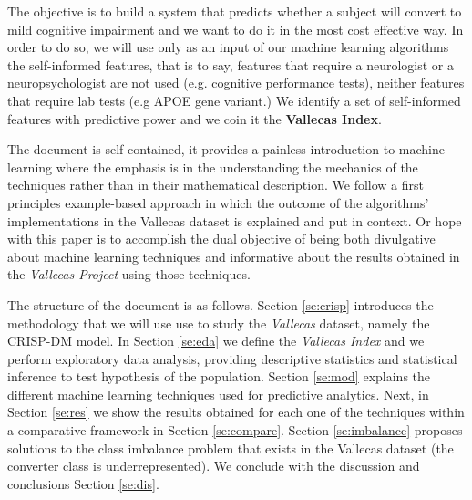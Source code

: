 \documentclass[11pt]{article}
\theoremstyle{definition}
\theoremstyle{remark}
\begin{document}
The objective is to build a system that predicts whether a subject will convert to mild cognitive impairment and we want to do it in the most cost effective way. In order to do so, we will use only as an input of our machine learning algorithms the self-informed features, that is to say, features that require a neurologist or a neuropsychologist are not used (e.g. cognitive performance tests), neither features that require lab tests (e.g APOE gene variant.)
We identify a set of self-informed features with predictive power and we coin it the \textbf{Vallecas Index}. 

The document is self contained, it provides a painless introduction to machine learning where the emphasis is in the understanding the mechanics of the techniques rather than in their mathematical description. We follow a first principles example-based approach in which the outcome of the algorithms' implementations in the Vallecas dataset is explained and put in context. Or hope with this paper is to accomplish the dual objective of being both divulgative about machine learning techniques and informative about the results obtained in the \emph{Vallecas Project} using those techniques.

The structure of the document is as follows. Section \ref{se:crisp} introduces the methodology that we will use use to study the \emph{Vallecas} dataset, namely the CRISP-DM model. In Section \ref{se:eda} we define the \emph{Vallecas Index} and we perform exploratory data analysis, providing descriptive statistics and statistical inference to test hypothesis of the population. Section \ref{se:mod} explains the different machine learning techniques used for predictive analytics. Next, in Section \ref{se:res} we show the results obtained for each one of the techniques within a comparative framework in Section \ref{se:compare}. Section \ref{se:imbalance} proposes solutions to the class imbalance problem that exists in the Vallecas dataset (the converter class is underrepresented). We conclude with the discussion and conclusions Section \ref{se:dis}.
\end{document}
